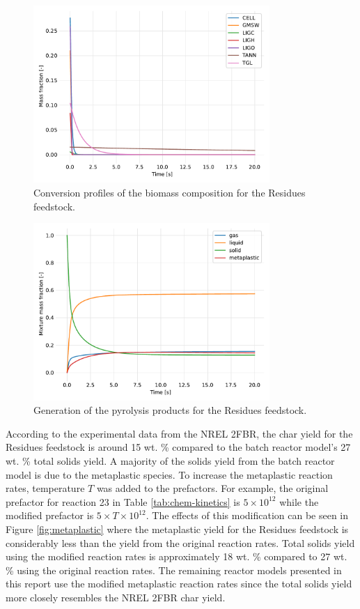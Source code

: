 \begin{figure}[H]
    \centering
    \includegraphics[width=0.8\textwidth]{figures/batch-biocomp.pdf}
    \caption{Conversion profiles of the biomass composition for the Residues feedstock.}
    \label{fig:batch-biocomp}
\end{figure}

\begin{figure}[H]
    \centering
    \includegraphics[width=0.8\textwidth]{figures/batch-products.pdf}
    \caption{Generation of the pyrolysis products for the Residues feedstock.}
    \label{fig:batch-products}
\end{figure}

According to the experimental data from the NREL 2FBR, the char yield for the Residues feedstock is around 15 wt. \% compared to the batch reactor model's 27 wt. \% total solids yield. A majority of the solids yield from the batch reactor model is due to the metaplastic species. To increase the metaplastic reaction rates, temperature $T$ was added to the prefactors. For example, the original prefactor for reaction 23 in Table \ref{tab:chem-kinetics} is $5 \times 10^{12}$ while the modified prefactor is $5 \times T \times 10^{12}$. The effects of this modification can be seen in Figure \ref{fig:metaplastic} where the metaplastic yield for the Residues feedstock is considerably less than the yield from the original reaction rates. Total solids yield using the modified reaction rates is approximately 18 wt. \% compared to 27 wt. \% using the original reaction rates. The remaining reactor models presented in this report use the modified metaplastic reaction rates since the total solids yield more closely resembles the NREL 2FBR char yield.

